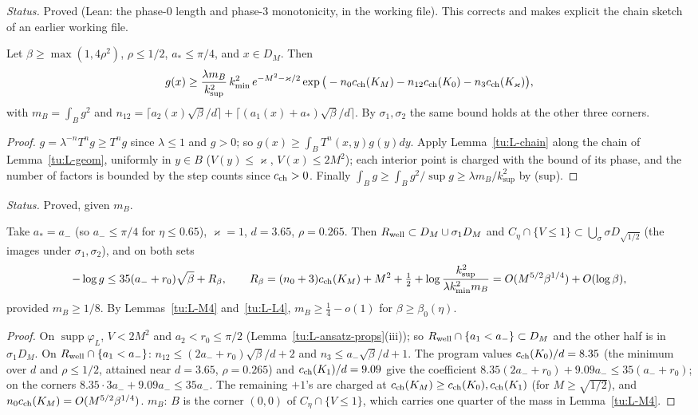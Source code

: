 \noindent\emph{Status.} Proved (Lean: the phase-0 length and phase-3 monotonicity, in the working file). This corrects
and makes explicit the chain sketch of an earlier working file.

\begin{theorem}[H4]\label{tu:L-H4}
Let $\beta\ge\max(1,4\rho^2)$, $\rho\le1/2$, $a_*\le\pi/4$, and $x\in D_M$. Then
\[
g(x)\ge\frac{\lambda m_B}{k_{\sup}^2}\,k_{\min}^2\,e^{-M^2-\varkappa/2}\exp\big(-n_0c_{\rm ch}(K_M)-n_{12}c_{\rm ch}(K_0)-n_3c_{\rm ch}(K_\varkappa)\big),
\]
with $m_B=\int_Bg^2$ and $n_{12}=\lceil a_2(x)\sqrt\beta/d\rceil+\lceil(a_1(x)+a_*)\sqrt\beta/d\rceil$. By $\sigma_1,\sigma_2$ the same
bound holds at the other three corners.
\end{theorem}

\begin{proof}
$g=\lambda^{-n}T^ng\ge T^ng$ since $\lambda\le1$ and $g>0$; so $g(x)\ge\int_BT^n(x,y)g(y)dy$. Apply Lemma~\ref{tu:L-chain}
along the chain of Lemma~\ref{tu:L-geom}, uniformly in $y\in B$ ($V(y)\le\varkappa$, $V(x)\le2M^2$); each interior point is
charged with the bound of its phase, and the number of factors is bounded by the step counts since $c_{\rm ch}>0$. Finally
$\int_Bg\ge\int_Bg^2/\sup g\ge\lambda m_B/k_{\sup}^2$ by (sup).
\end{proof}

\noindent\emph{Status.} Proved, given $m_B$.

\begin{corollary}\label{tu:L-H4cor}
Take $a_*=a_-$ (so $a_-\le\pi/4$ for $\eta\le0.65$), $\varkappa=1$, $d=3.65$, $\rho=0.265$. Then
$R_{\rm well}\subset D_M\cup\sigma_1D_M$ and $C_\eta\cap\{V\le1\}\subset\bigcup_{\sigma}\sigma D_{\sqrt{1/2}}$ (the images under
$\sigma_1,\sigma_2$), and on both sets
\[
-\log g\le35(a_-+r_0)\sqrt\beta+R_\beta,\qquad R_\beta=(n_0+3)c_{\rm ch}(K_M)+M^2+\tfrac12+\log\frac{k_{\sup}^2}{\lambda k_{\min}^2m_B}
=O(M^{5/2}\beta^{1/4})+O(\log\beta),
\]
provided $m_B\ge1/8$. By Lemmas~\ref{tu:L-M4} and~\ref{tu:L-L4}, $m_B\ge\frac14-o(1)$ for $\beta\ge\beta_0(\eta)$.
\end{corollary}

\begin{proof}
On $\operatorname{supp}\varphi_L$, $V<2M^2$ and $a_2<r_0\le\pi/2$ (Lemma~\ref{tu:L-ansatz-props}(iii)); so
$R_{\rm well}\cap\{a_1<a_-\}\subset D_M$ and the other half is in $\sigma_1D_M$. On $R_{\rm well}\cap\{a_1<a_-\}$:
$n_{12}\le(2a_-+r_0)\sqrt\beta/d+2$ and $n_3\le a_-\sqrt\beta/d+1$. The program values $c_{\rm ch}(K_0)/d=8.35$ (the minimum over
$d$ and $\rho\le1/2$, attained near $d=3.65$, $\rho=0.265$) and $c_{\rm ch}(K_1)/d=9.09$ give the coefficient
$8.35(2a_-+r_0)+9.09a_-\le35(a_-+r_0)$; on the corners $8.35\cdot3a_-+9.09a_-\le35a_-$. The remaining $+1$'s are charged at
$c_{\rm ch}(K_M)\ge c_{\rm ch}(K_0),c_{\rm ch}(K_1)$ (for $M\ge\sqrt{1/2}$), and $n_0c_{\rm ch}(K_M)=O(M^{5/2}\beta^{1/4})$. $m_B$: $B$ is the corner
$(0,0)$ of $C_\eta\cap\{V\le1\}$, which carries one quarter of the mass in Lemma~\ref{tu:L-M4}.
\end{proof}

